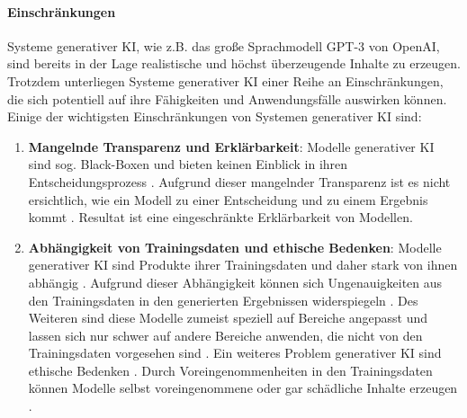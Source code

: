 \paragraph{Einschränkungen}
Systeme generativer KI, wie z.B. das große Sprachmodell GPT-3 von OpenAI, sind bereits in der Lage realistische und höchst überzeugende Inhalte zu erzeugen.
Trotzdem unterliegen Systeme generativer KI einer Reihe an Einschränkungen, die sich potentiell auf ihre Fähigkeiten und Anwendungsfälle auswirken können.
Einige der wichtigsten Einschränkungen von Systemen generativer KI sind:
\begin{enumerate}
    \item \textbf{Mangelnde Transparenz und Erklärbarkeit}: Modelle generativer KI sind sog. Black-Boxen und bieten keinen Einblick in ihren Entscheidungsprozess \cite{explainable-ai-kobold}.
    Aufgrund dieser mangelnder Transparenz ist es nicht ersichtlich, wie ein Modell zu einer Entscheidung und zu einem Ergebnis kommt \cite{explainable-ai-kobold}.
    Resultat ist eine eingeschränkte Erklärbarkeit von Modellen.

    \item \textbf{Abhängigkeit von Trainingsdaten und ethische Bedenken}: Modelle generativer KI sind Produkte ihrer Trainingsdaten und daher stark von ihnen abhängig \cite{klinkhammer-genai}.
    Aufgrund dieser Abhängigkeit können sich Ungenauigkeiten aus den Trainingsdaten in den generierten Ergebnissen widerspiegeln \cite{klinkhammer-genai}.
    Des Weiteren sind diese Modelle zumeist speziell auf Bereiche angepasst und lassen sich nur schwer auf andere Bereiche anwenden, die nicht von den Trainingsdaten vorgesehen sind \cite{klinkhammer-genai}.
    Ein weiteres Problem generativer KI sind ethische Bedenken \cite{klinkhammer-genai}.
    Durch Voreingenommenheiten in den Trainingsdaten können Modelle selbst voreingenommene oder gar schädliche Inhalte erzeugen \cite{klinkhammer-genai}.



\end{enumerate}
